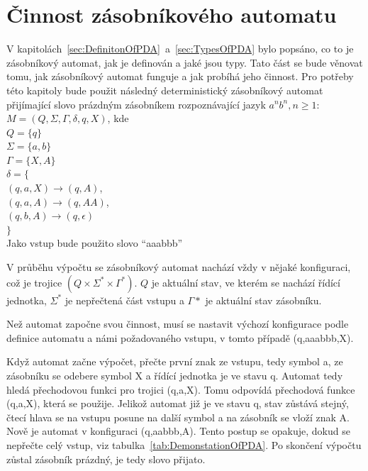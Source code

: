 \section{Činnost zásobníkového automatu}

V kapitolách~\ref{sec:DefinitonOfPDA}~a~\ref{sec:TypesOfPDA} bylo popsáno, co to je zásobníkový automat, jak je definován a jaké jsou typy. Tato část se bude věnovat tomu, jak zásobníkový automat funguje a jak probíhá jeho činnost. Pro potřeby této kapitoly bude použit následný deterministický zásobníkový automat přijímající slovo prázdným zásobníkem rozpoznávající jazyk $a^{n}b^{n}, n \ge 1$:\\
$M = (Q, \Sigma, \Gamma, \delta, q, X)$, kde \\
\indent$Q = \{q\}$\\
\indent$\Sigma = \{a,b\}$\\
\indent$\Gamma = \{X,A\}$\\
\indent$\delta = \{$\\
\indent\indent$(q,a,X) \rightarrow (q,A)$,\\
\indent\indent$(q,a,A) \rightarrow (q,AA)$,\\
\indent\indent$(q,b,A) \rightarrow (q,\epsilon)$\\
\indent$\}$\\
Jako vstup bude použito slovo ``aaabbb''

V průběhu výpočtu se zásobníkový automat nachází vždy v nějaké konfiguraci, což je trojice $(Q \times \Sigma^{*} \times \Gamma^{*})$. $Q$ je aktuální stav, ve kterém se nachází řídící jednotka, $\Sigma^{*}$ je nepřečtená část vstupu a $\Gamma{*}$ je aktuální stav zásobníku. 

Než automat započne svou činnost, musí se nastavit výchozí konfigurace podle definice automatu a námi požadovaného vstupu, v tomto případě (q,aaabbb,X). 

Když automat začne výpočet, přečte první znak ze vstupu, tedy symbol a, ze zásobníku se odebere symbol X a řídící jednotka je ve stavu q. Automat tedy hledá přechodovou funkci pro trojici (q,a,X). Tomu odpovídá přechodová funkce (q,a,X), která se použije. Jelikož automat již je ve stavu q, stav zůstává stejný, čtecí hlava se na vstupu posune na další symbol a na zásobník se vloží znak A. Nově je automat v konfiguraci (q,aabbb,A). Tento postup se opakuje, dokud se nepřečte celý vstup, viz tabulka~\ref{tab:DemonstationOfPDA}. Po skončení výpočtu zůstal zásobník prázdný, je tedy slovo přijato. 

